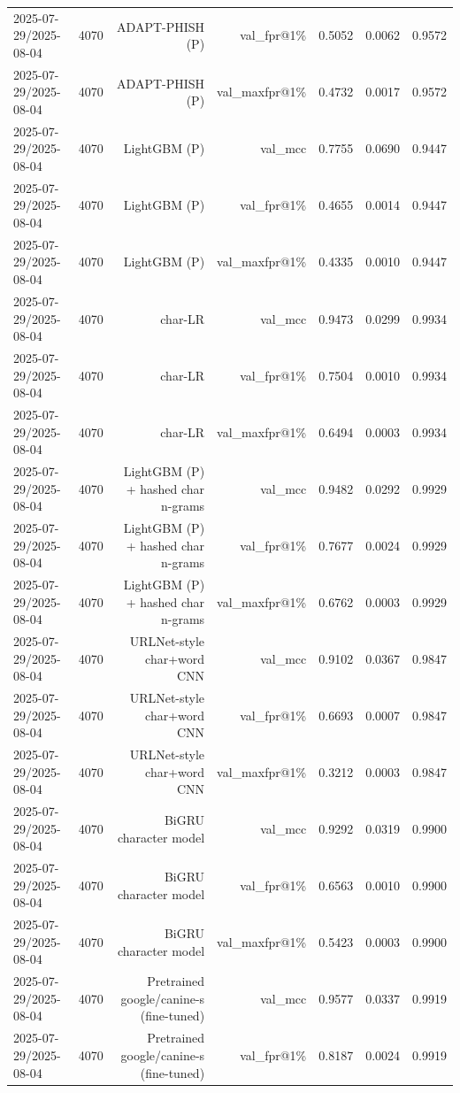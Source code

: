 \begin{table}[t]
\begin{tabular}{llrrrrr}
2025-07-29/2025-08-04 & 4070 & ADAPT-PHISH (P) & val\_fpr@1\% & 0.5052 & 0.0062 & 0.9572 \\
2025-07-29/2025-08-04 & 4070 & ADAPT-PHISH (P) & val\_maxfpr@1\% & 0.4732 & 0.0017 & 0.9572 \\
2025-07-29/2025-08-04 & 4070 & LightGBM (P) & val\_mcc & 0.7755 & 0.0690 & 0.9447 \\
2025-07-29/2025-08-04 & 4070 & LightGBM (P) & val\_fpr@1\% & 0.4655 & 0.0014 & 0.9447 \\
2025-07-29/2025-08-04 & 4070 & LightGBM (P) & val\_maxfpr@1\% & 0.4335 & 0.0010 & 0.9447 \\
2025-07-29/2025-08-04 & 4070 & char-LR & val\_mcc & 0.9473 & 0.0299 & 0.9934 \\
2025-07-29/2025-08-04 & 4070 & char-LR & val\_fpr@1\% & 0.7504 & 0.0010 & 0.9934 \\
2025-07-29/2025-08-04 & 4070 & char-LR & val\_maxfpr@1\% & 0.6494 & 0.0003 & 0.9934 \\
2025-07-29/2025-08-04 & 4070 & LightGBM (P) + hashed char n-grams & val\_mcc & 0.9482 & 0.0292 & 0.9929 \\
2025-07-29/2025-08-04 & 4070 & LightGBM (P) + hashed char n-grams & val\_fpr@1\% & 0.7677 & 0.0024 & 0.9929 \\
2025-07-29/2025-08-04 & 4070 & LightGBM (P) + hashed char n-grams & val\_maxfpr@1\% & 0.6762 & 0.0003 & 0.9929 \\
2025-07-29/2025-08-04 & 4070 & URLNet-style char+word CNN & val\_mcc & 0.9102 & 0.0367 & 0.9847 \\
2025-07-29/2025-08-04 & 4070 & URLNet-style char+word CNN & val\_fpr@1\% & 0.6693 & 0.0007 & 0.9847 \\
2025-07-29/2025-08-04 & 4070 & URLNet-style char+word CNN & val\_maxfpr@1\% & 0.3212 & 0.0003 & 0.9847 \\
2025-07-29/2025-08-04 & 4070 & BiGRU character model & val\_mcc & 0.9292 & 0.0319 & 0.9900 \\
2025-07-29/2025-08-04 & 4070 & BiGRU character model & val\_fpr@1\% & 0.6563 & 0.0010 & 0.9900 \\
2025-07-29/2025-08-04 & 4070 & BiGRU character model & val\_maxfpr@1\% & 0.5423 & 0.0003 & 0.9900 \\
2025-07-29/2025-08-04 & 4070 & Pretrained google/canine-s (fine-tuned) & val\_mcc & 0.9577 & 0.0337 & 0.9919 \\
2025-07-29/2025-08-04 & 4070 & Pretrained google/canine-s (fine-tuned) & val\_fpr@1\% & 0.8187 & 0.0024 & 0.9919 \\

\end{tabular}
\end{table}
